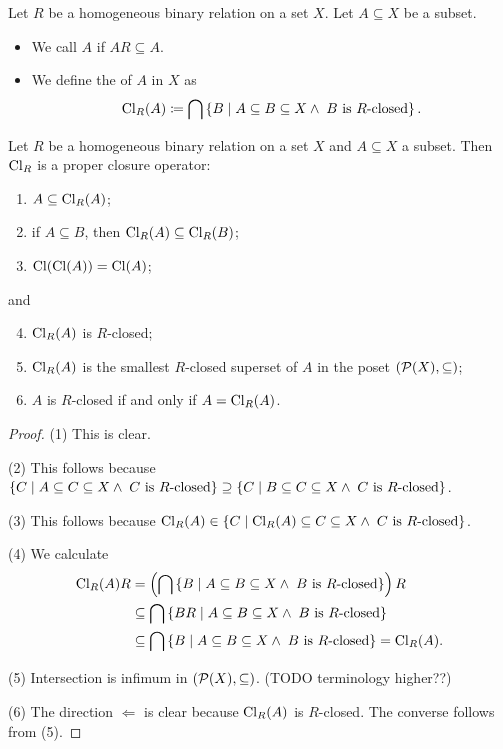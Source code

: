 \begin{definition}
Let $R$ be a homogeneous binary relation on a set $X$. Let $A\subseteq X$ be a subset.
\begin{itemize}
\item We call $A$  if $AR \subseteq A$.
\item We define the  of $A$ in $X$ as
\[ \operatorname{Cl}_R(A) \coloneqq \bigcap \left\{ B \;\middle|\; A \subseteq B \subseteq X \land \;\text{$B$ is $R$-closed} \right\}. \]
\end{itemize}
\end{definition}

\begin{proposition} \label{RclosureIsClosure}
Let $R$ be a homogeneous binary relation on a set $X$ and $A\subseteq X$ a subset. Then $\operatorname{Cl}_R$ is a proper closure operator:
\begin{enumerate}
\item $A \subseteq \operatorname{Cl}_R(A)$;
\item if $A\subseteq B$, then $\operatorname{Cl}_R(A) \subseteq \operatorname{Cl}_R(B)$;
\item $\operatorname{Cl}(\operatorname{Cl}(A)) = \operatorname{Cl}(A)$;
\end{enumerate}
and
\begin{enumerate} \setcounter{enumi}{3}
\item $\operatorname{Cl}_R(A)$ is $R$-closed;
\item $\operatorname{Cl}_R(A)$ is the smallest $R$-closed superset of $A$ in the poset $\left( \operatorname{\mathcal{P}}(X),\subseteq \right)$;
\item $A$ is $R$-closed \textup{if and only if} $A = \operatorname{Cl}_R(A)$.
\end{enumerate}
\end{proposition}
\begin{proof}
(1) This is clear.

(2) This follows because $\left\{ C \;\middle|\; A \subseteq C \subseteq X \land \;\text{$C$ is $R$-closed} \right\} \supseteq \left\{ C \;\middle|\; B \subseteq C \subseteq X \land \;\text{$C$ is $R$-closed} \right\}$.

(3) This follows because $\operatorname{Cl}_R(A) \in \left\{ C \;\middle|\; \operatorname{Cl}_R(A) \subseteq C \subseteq X \land \;\text{$C$ is $R$-closed} \right\}$.

(4) We calculate
\begin{align*}
\operatorname{Cl}_R(A)R &= \left(\bigcap \left\{ B \;\middle|\; A \subseteq B \subseteq X \land \;\text{$B$ is $R$-closed} \right\}\right)R \\
&\subseteq \bigcap \left\{ BR \;\middle|\; A \subseteq B \subseteq X \land \;\text{$B$ is $R$-closed} \right\} \\
&\subseteq \bigcap \left\{ B \;\middle|\; A \subseteq B \subseteq X \land \;\text{$B$ is $R$-closed} \right\} = \operatorname{Cl}_R(A).
\end{align*}

(5) Intersection is infimum in $\left( \operatorname{\mathcal{P}}(X),\subseteq \right)$. (TODO terminology higher??)

(6) The direction $\Leftarrow$ is clear because $\operatorname{Cl}_R(A)$ is $R$-closed. The converse follows from (5).
\end{proof}


